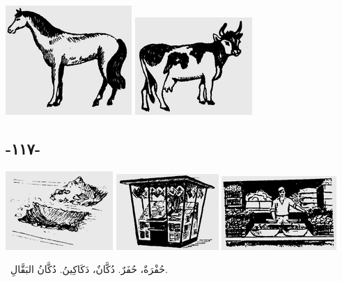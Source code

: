 \documentclass[a5paper]{article}
\begin{document}
 \includegraphics[width=1.8854in,height=1.6354in]{MuhammadBagauddinlatinized-img334.png}   \includegraphics[width=1.75in,height=1.4583in]{MuhammadBagauddinlatinized-img335.png} 

\subsection{-١١٧-}
 \includegraphics[width=1.6043in,height=1.1772in]{MuhammadBagauddinlatinized-img336.png}   \includegraphics[width=1.5311in,height=1.1354in]{MuhammadBagauddinlatinized-img337.png}   \includegraphics[width=1.7189in,height=1.1043in]{MuhammadBagauddinlatinized-img338.png} 

\ حُفْرَةٌ، حُفَرٌ. دُكَّانٌ، دَكَاكِينُ. دُكَّانُ البَقَّالِ. 
\end{document}
